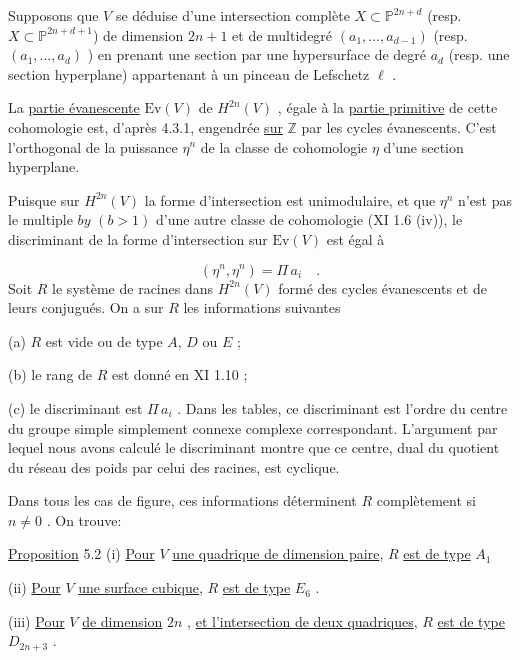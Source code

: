 Supposons que $V$ se déduise d'une intersection complète $X \subset \mathbb{P}^{2n+d}$ (resp. $X \subset \mathbb{P}^{2n+d+1}$) de dimension $2n + 1$ et de multidegré $(a_1,\ldots,a_{d-1})$ (resp. $(a_1,\ldots,a_d)$ ) en prenant une section par une hypersurface de degré $a_d$ (resp. une section hyperplane) appartenant à un pinceau de Lefschetz $\ell$ .

La \underline{partie évanescente} $\mathrm{Ev}(V)$ de $H^{2n}(V)$ , égale à la \underline{partie primitive} de cette cohomologie est, d'après 4.3.1, engendrée \underline{sur} $\mathbb{Z}$ par les cycles évanescents. C'est l'orthogonal de la puissance $\eta^n$ de la classe de cohomologie $\eta$ d'une section hyperplane.

Puisque sur $H^{2n}(V)$ la forme d'intersection est unimodulaire, et que $\eta^n$ n'est pas le multiple $b y$ $(b > 1)$ d'une autre classe de cohomologie (XI 1.6 (iv)), le discriminant de la forme d'intersection sur $\mathrm{Ev}(V)$ est égal à

\begin{equation*}
(\eta^n, \eta^n) = \Pi\, a_i \quad .
\end{equation*}
Soit $R$ le système de racines dans $H^{2n}(V)$ formé des cycles évanescents et de leurs conjugués. On a sur $R$ les informations suivantes

(a) \quad $R$ est vide ou de type $A$, $D$ ou $E$ ;

(b) \quad le rang de $R$ est donné en XI 1.10 ;

(c) \quad le discriminant est $\Pi\, a_i$ . Dans les tables, ce discriminant est l'ordre du centre du groupe simple simplement connexe complexe correspondant. L'argument par lequel nous avons calculé le discriminant montre que ce centre, dual du quotient du réseau des poids par celui des racines, est cyclique.



Dans tous les cas de figure, ces informations déterminent $R$ complètement si $n \neq 0$ . On trouve:

\underline{Proposition} 5.2 \quad (i) \underline{Pour} $V$ \underline{une quadrique de dimension paire}, $R$ \underline{est de type} $A_1$

(ii) \underline{Pour} $V$ \underline{une surface cubique}, $R$ \underline{est de type} $E_6$ .

(iii) \underline{Pour} $V$ \underline{de dimension} $2n$ , \underline{et l'intersection de deux quadriques}, $R$ \underline{est de type} $D_{2n+3}$ .

